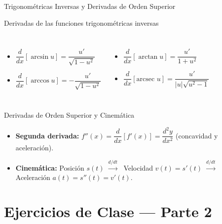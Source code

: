 \documentclass[aspectratio=169]{beamer}
\begin{document}
\begin{frame}{Trigonométricas Inversas y Derivadas de Orden Superior}
  \begin{block}{Derivadas de las funciones trigonométricas inversas}
    \begin{columns}[T]
      \begin{itemize}
        \item $\dfrac{d}{dx}[\arcsin u] = \dfrac{u'}{\sqrt{1 - u^2}}$
        \item $\dfrac{d}{dx}[\arccos u] = -\dfrac{u'}{\sqrt{1 - u^2}}$
      \end{itemize}
      \begin{itemize}
        \item $\dfrac{d}{dx}[\arctan u] = \dfrac{u'}{1 + u^2}$
        \item $\dfrac{d}{dx}[\text{arcsec } u] = \dfrac{u'}{|u|\sqrt{u^2 - 1}}$
      \end{itemize}
    \end{columns}
  \end{block}

  \vspace{4pt}
  \begin{block}{Derivadas de Orden Superior y Cinemática}
    \begin{itemize}
      \item \textbf{Segunda derivada:} $f''(x) = \dfrac{d}{dx}[f'(x)] = \dfrac{d^2y}{dx^2}$ \quad (concavidad y aceleración).
      \item \textbf{Cinemática:} Posición $s(t) \;\xrightarrow{d/dt}\;$ Velocidad $v(t) = s'(t) \;\xrightarrow{d/dt}\;$ Aceleración $a(t) = s''(t) = v'(t)$.
    \end{itemize}
  \end{block}
\end{frame}



\section{Ejercicios de Clase — Parte 2}
\end{document}
